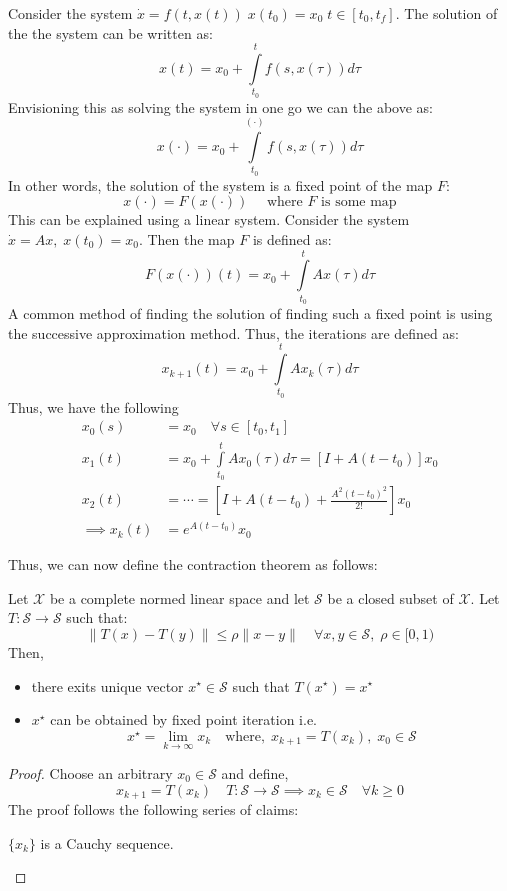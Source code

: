 Consider the system \(\dot{x} = f(t,x(t)) \; x(t_0) = x_0 \; t \in [t_0, t_f]\). The solution of the
the system can be written as:
\[
    x(t) = x_0 + \int\limits_{t_0}^{t} f(s, x(\tau )) d\tau
\]
Envisioning this as solving the system in one go we can the above as:
\[
    x(\cdot) = x_0 + \int\limits_{t_0}^{(\cdot)} f(s, x(\tau )) d\tau
\]
In other words, the solution of the system is a fixed point of the map \(F\): 
\[
    x(\cdot) = F(x(\cdot)) \quad \text{ where }F \text{ is some map}  
\]
This can be explained using a linear system. Consider the system \(\dot{x} = Ax, \; x(t_0) = x_0\).
Then the map \(F\) is defined as:
\[
    F(x(\cdot))(t) = x_0 + \int\limits_{t_0}^{t} A x(\tau) d\tau
\]
A common method of finding the solution of finding such a fixed point is using the successive
approximation method. Thus, the iterations are defined as:
\[
    x_{k+1}(t) = x_0 + \int\limits_{t_0}^{t} A x_k(\tau) d\tau
\]
Thus, we have the following
\[
    \begin{aligned}
        x_0(s) &= x_0 \quad \forall s \in [t_0, t_1] \\
        x_1(t) &= x_0 + \int\limits_{t_0}^{t} A x_0(\tau) d\tau = \left[ I + A(t-t_0) \right] x_0\\
        x_2(t) &= \cdots  = \left[ I + A(t-t_0) + \frac{A^2(t-t_0)^2}{2!} \right] x_0 \\
        \implies x_k(t) &= e^{A(t-t_0)} x_0
    \end{aligned}
\]

Thus, we can now define the contraction theorem as follows:
\begin{theorem}
    Let \(\mathcal{X} \) be a complete normed linear space and let \(\mathcal{S} \) be a closed subset 
    of \(\mathcal{X} \). Let \(T : \mathcal{S} \to  \mathcal{S} \) such that:
    \[
        \lVert T(x) - T(y) \rVert \leq \rho  \lVert x - y \rVert \quad \forall x, y \in \mathcal{S}, \;
        \rho \in [0,1)
    \]
    Then,
    \begin{itemize}
        \item there exits  unique vector \(x^{\star} \in \mathcal{S}\) such that \(T(x^{\star}) = x^{\star}\)
        \item \(x^{\star} \) can be obtained by fixed point iteration i.e. 
        \[
            x^{\star}  = \lim\limits_{k \to \infty} x_k \quad \text{where}, \; x_{k+1} = T(x_k), \;
            x_0 \in \mathcal{S}
        \]
    \end{itemize}
\end{theorem}
\begin{proof}
    Choose an arbitrary \(x_0 \in \mathcal{S}\) and define,
    \[
        x_{k+1} = T(x_k) \quad T : \mathcal{S} \to \mathcal{S} \implies x_k \in \mathcal{S} \quad
         \forall k \geq 0
    \]
    The proof follows the following series of claims:
    \begin{claims}
        \(\{x_k\}\) is a Cauchy sequence.
    \end{claims}
\end{proof}

